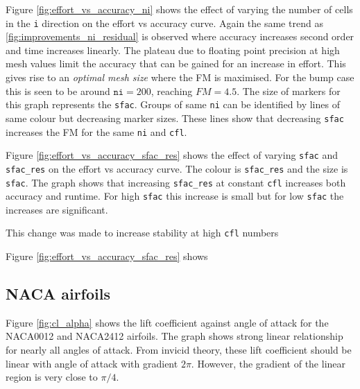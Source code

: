 \documentclass{article}
\begin{document}
Figure \ref{fig:effort_vs_accuracy_ni} shows the effect of varying the number of cells in the \texttt{i} direction on the effort vs accuracy curve.
Again the same trend as \ref{fig:improvements_ni_residual} is observed where accuracy increases second order and time increases linearly.
The plateau due to floating point precision at high mesh values limit the accuracy that can be gained for an increase in effort.
This gives rise to an \textit{optimal mesh size} where the FM is maximised.
For the bump case this is seen to be around $\texttt{ni}=200$, reaching $FM =4.5$.
The size of markers for this graph represents the \texttt{sfac}.
Groups of same \texttt{ni} can be identified by lines of same colour but decreasing marker sizes.
These lines show that decreasing \texttt{sfac} increases the FM for the same \texttt{ni} and \texttt{cfl}.

Figure \ref{fig:effort_vs_accuracy_sfac_res} shows the effect of varying \texttt{sfac} and \texttt{sfac\_res} on the effort vs accuracy curve.
The colour is \texttt{sfac\_res} and the size is \texttt{sfac}.
The graph shows that increasing \texttt{sfac\_res} at constant \texttt{cfl} increases both accuracy and runtime.
For high \texttt{sfac} this increase is small but for low \texttt{sfac} the increases are significant.

This change was made to increase stability at high \texttt{cfl} numbers %



Figure \ref{fig:effort_vs_accuracy_sfac_res} shows 

\subsection{NACA airfoils}

Figure \ref{fig:cl_alpha} shows the lift coefficient against angle of attack for the NACA0012 and NACA2412 airfoils.
The graph shows strong linear relationship for nearly all angles of attack.
From invicid theory, these lift coefficient should be linear with angle of attack with gradient $ 2\pi $.
However, the gradient of the linear region is very close to $\pi/4$.

\end{document}
